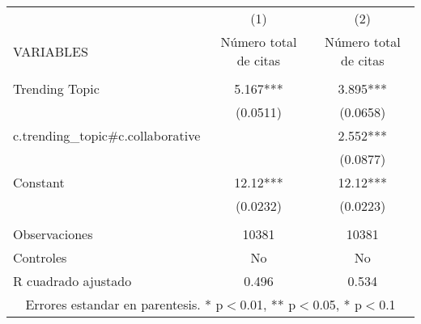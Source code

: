 \documentclass[]{article}
\begin{document}
\begin{tabular}{lcc} \hline
 & (1) & (2) \\
VARIABLES & Número total de citas & Número total de citas \\ \hline
 &  &  \\
Trending Topic & 5.167*** & 3.895*** \\
 & (0.0511) & (0.0658) \\
c.trending\_topic\#c.collaborative &  & 2.552*** \\
 &  & (0.0877) \\
Constant & 12.12*** & 12.12*** \\
 & (0.0232) & (0.0223) \\
 &  &  \\
Observaciones & 10381 & 10381 \\
Controles & No & No \\
 R cuadrado ajustado & 0.496 & 0.534 \\ \hline
\multicolumn{3}{c}{ Errores estandar en parentesis. * p$<$0.01, ** p$<$0.05, * p$<$0.1} \\
\end{tabular}
\end{document}
